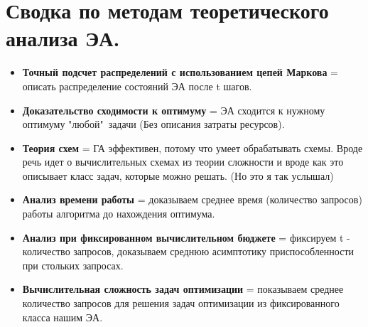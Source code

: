 \section{Сводка по методам теоретического анализа ЭА.}

\begin{itemize}
    \item \textbf{Точный подсчет распределений с использованием цепей Маркова} =
    описать распределение состояний ЭА после t шагов.
    \item \textbf{Доказательство сходимости к оптимуму} = ЭА сходится к нужному
    оптимуму "любой"\ задачи (Без описания затраты ресурсов).
    \item \textbf{Теория схем} = ГА эффективен, потому что умеет обрабатывать
    схемы. Вроде речь идет о вычислительных схемах из теории сложности и вроде
    как это описывает класс задач, которые можно решать. (Но это я так услышал)
    \item \textbf{Анализ времени работы} = доказываем среднее время (количество
    запросов) работы алгоритма до нахождения оптимума.
    \item \textbf{Анализ при фиксированном вычислительном бюджете} = фиксируем
    t - количество запросов, доказываем среднюю асимптотику приспособленности
    при стольких запросах.
    \item \textbf{Вычислительная сложность задач оптимизации} = показываем
    среднее количество запросов для решения задач оптимизации из фиксированного
    класса нашим ЭА.
\end{itemize}